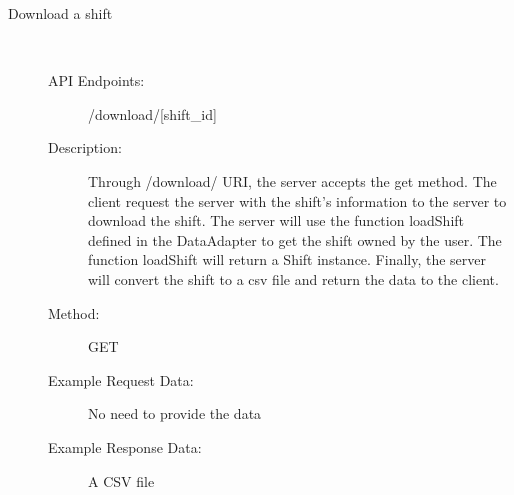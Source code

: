 \documentclass[11pt, oneside]{article}   	%
\begin{document}
\begin{description}
\item[Download a shift]
\
\begin{description}
\item[API Endpoints:] /download/[shift\_id]
\item[Description:]Through /download/ URI, the server accepts the get method. The client request the server with the shift’s information to the server to download the shift.
The server will use the function loadShift defined in the DataAdapter to get the shift owned by the user. The function loadShift will return a Shift instance. Finally, the server will convert the shift to a csv file and return the data to the client.
\item[Method:] GET
\item[Example Request Data:] No need to provide the data
\item[Example Response Data:] A CSV file
\end{description}


\end{description}
\end{document}
